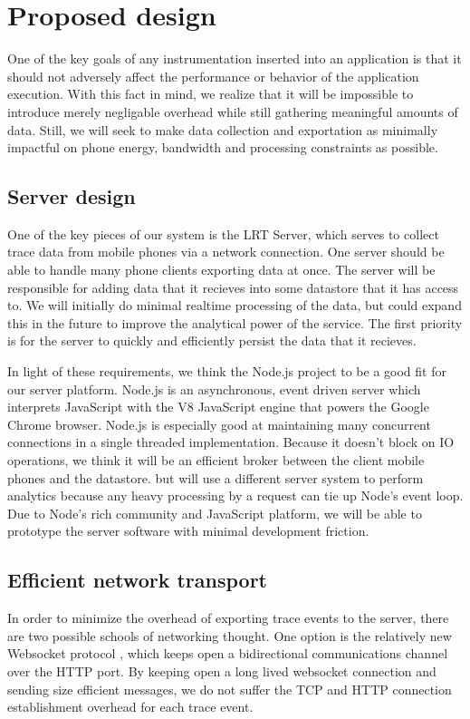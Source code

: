 \documentclass{acm_proc_article-sp}
\begin{document}
\section{Proposed design}
One of the key goals of any instrumentation inserted into an application is 
that it should not adversely affect the performance or behavior of the 
application execution. With this fact in mind, we realize that it will be 
impossible to introduce merely negligable overhead while still gathering
meaningful amounts of data. Still, we will seek to make data collection
and exportation as minimally impactful on phone energy, bandwidth and processing
constraints as possible.

\subsection{Server design}
One of the key pieces of our system is the LRT Server, which serves
to collect trace data from mobile phones via a network connection.
One server should be able to handle many phone clients exporting data at once.
The server will be responsible for adding data that it recieves into
some datastore that it has access to. We will initially do minimal realtime
processing of the data, but could expand this in the future to improve the
analytical power of the service. The first priority is for the server to quickly
and efficiently persist the data that it recieves.

In light of these requirements, we think the Node.js \cite{node}
project to be a good fit for our server platform.
Node.js is an asynchronous, event driven server 
which interprets JavaScript with the V8 JavaScript engine \cite{V8-javascript} that
powers the Google Chrome browser. Node.js is especially good
at maintaining many concurrent connections in a single threaded implementation.
Because it doesn't block on IO operations, we think it will be an efficient broker
between the client mobile phones and the datastore. but will use a different server
system to perform analytics
because any heavy processing by a request can tie up Node's event loop.
Due to Node's rich community and JavaScript platform,
we will be able to prototype the server software with minimal development friction.

\subsection{Efficient network transport}
In order to minimize the overhead of exporting trace 
events to the server, there are two possible schools of networking thought.
One option is the relatively new Websocket protocol 
\cite{WebsocketRFC}, which keeps open a bidirectional communications channel 
over the HTTP port. By keeping open a long lived 
websocket connection and sending size efficient 
messages, we do not suffer the TCP and HTTP connection establishment overhead 
for each trace event. 
\end{document}
